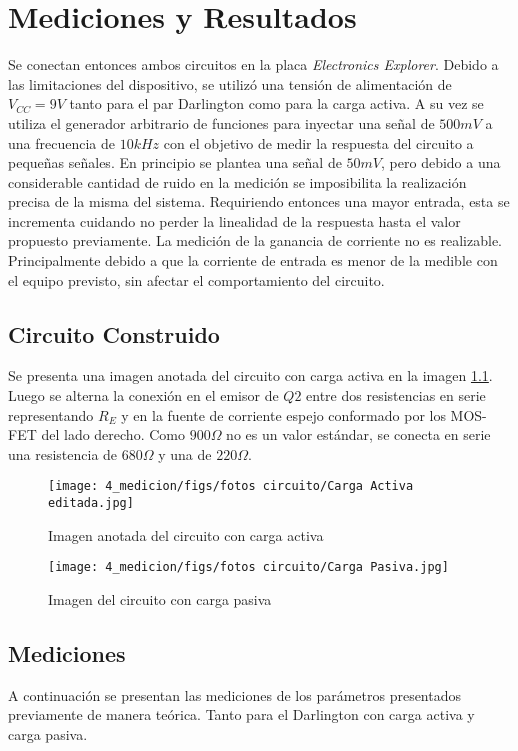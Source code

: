 \chapter{Mediciones y Resultados}
Se conectan entonces ambos circuitos en la placa \textit{Electronics Explorer}. Debido a las limitaciones del dispositivo, se utilizó una tensión de alimentación de $V_{CC} = 9V$ tanto para el par Darlington como para la carga activa.
A su vez se utiliza el generador arbitrario de funciones para inyectar una señal de $500 mV$ a una frecuencia de $10kHz$ con el objetivo de medir la respuesta del circuito a pequeñas señales. En principio se plantea una señal de $50 mV$, pero debido a una considerable cantidad de ruido en la medición se imposibilita la realización precisa de la misma del sistema.
Requiriendo entonces una mayor entrada, esta se incrementa cuidando no perder la linealidad de la respuesta hasta el valor propuesto previamente.
La medición de la ganancia de corriente no es realizable. Principalmente debido a que la corriente de entrada es menor de la medible con el equipo previsto, sin afectar el comportamiento del circuito.

\section{Circuito Construido}
Se presenta una imagen anotada del circuito con carga activa en la imagen \ref{fig: foto circuito carga activa}. Luego se alterna la conexión en el emisor de $Q2$ entre dos resistencias en serie representando $R_E$ y en la fuente de corriente espejo conformado por los MOS-FET del lado derecho. Como $900 \Omega$ no es un valor estándar, se conecta en serie una resistencia de $680 \Omega$ y una de $220 \Omega$.

\begin{figure}[ht]
    \centering
    \texttt{[image: 4\_medicion/figs/fotos circuito/Carga Activa editada.jpg]}
    \caption{Imagen anotada del circuito con carga activa}\label{fig: foto circuito carga activa}
\end{figure}
\begin{figure}[ht]
    \centering
    \texttt{[image: 4\_medicion/figs/fotos circuito/Carga Pasiva.jpg]}
    \caption{Imagen del circuito con carga pasiva}\label{fig: foto circuito carga pasiva}
\end{figure}


\section{Mediciones}
A continuación se presentan las mediciones de los parámetros presentados previamente de manera teórica. Tanto para el Darlington con carga activa y carga pasiva.

